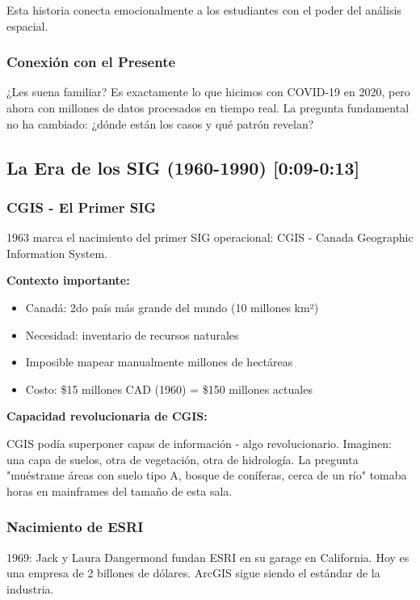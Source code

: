 \documentclass[11pt,a4paper]{article}
\newcommand{\tiempo}[1]{\textcolor{timecolor}{\textbf{[#1]}}}
\newcommand{\decir}[1]{\begin{tcolorbox}[colback=blue!5,colframe=usachblue,title={DECIR}]#1\end{tcolorbox}}
\newcommand{\nota}[1]{\begin{tcolorbox}[colback=yellow!10,colframe=orange,title={NOTA}]#1\end{tcolorbox}}
\begin{document}
\nota{Esta historia conecta emocionalmente a los estudiantes con el poder del análisis espacial.}

\subsubsection{Conexión con el Presente}

\decir{¿Les suena familiar? Es exactamente lo que hicimos con COVID-19 en 2020, pero ahora con millones de datos procesados en tiempo real. La pregunta fundamental no ha cambiado: ¿dónde están los casos y qué patrón revelan?}

\subsection{La Era de los SIG (1960-1990) \tiempo{0:09-0:13}}

\subsubsection{CGIS - El Primer SIG}

\decir{1963 marca el nacimiento del primer SIG operacional: CGIS - Canada Geographic Information System.}

\textbf{Contexto importante:}
\begin{itemize}
    \item Canadá: 2do país más grande del mundo (10 millones km²)
    \item Necesidad: inventario de recursos naturales
    \item Imposible mapear manualmente millones de hectáreas
    \item Costo: \$15 millones CAD (1960) = \$150 millones actuales
\end{itemize}

\textbf{Capacidad revolucionaria de CGIS:}

\decir{CGIS podía superponer capas de información - algo revolucionario. Imaginen: una capa de suelos, otra de vegetación, otra de hidrología. La pregunta "muéstrame áreas con suelo tipo A, bosque de coníferas, cerca de un río" tomaba horas en mainframes del tamaño de esta sala.}

\subsubsection{Nacimiento de ESRI}

\decir{1969: Jack y Laura Dangermond fundan ESRI en su garage en California. Hoy es una empresa de 2 billones de dólares. ArcGIS sigue siendo el estándar de la industria.}
\end{document}
